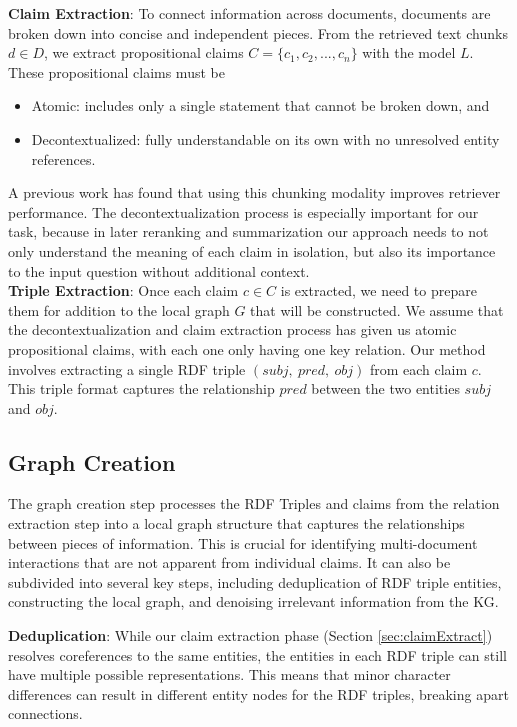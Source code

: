 \documentclass[11pt]{article}
\theoremstyle{definition}
\begin{document}
\noindent
\textbf{Claim Extraction}\label{sec:claimExtract}: To connect information across documents, documents are broken down into concise and independent pieces. From the retrieved text chunks $d \in D$, we extract propositional claims $C = \{c_1, c_2, ..., c_n\}$ with the model $L$. These propositional claims must be
\begin{itemize}[noitemsep,leftmargin=*]
    \item Atomic: includes only a single statement that cannot be broken down, and
    \item Decontextualized: fully understandable on its own with no unresolved entity references.
\end{itemize}
A previous work \cite{DBLP:conf/emnlp/Chen0C0MZ0024} has found that using this chunking modality improves retriever performance. The decontextualization process is especially important for our task, because in later reranking and summarization our approach needs to not only understand the meaning of each claim in isolation, but also its importance to the input question without additional context.\\

\noindent
\textbf{Triple Extraction}\label{sec:tripleExtract}: Once each claim $c \in C$ is extracted, we need to prepare them for addition to the local graph $G$ that will be constructed. We assume that the decontextualization and claim extraction process has given us atomic propositional claims, with each one only having one key relation. Our method involves extracting a single RDF triple $(subj,\ pred,\ obj)$ from each claim $c$. This triple format captures the relationship $pred$ between the two entities $subj$ and $obj$.  

\subsection{Graph Creation}\label{sec:graphcreate}
The graph creation step processes the RDF Triples and claims from the relation extraction step into a local graph structure that captures the relationships between pieces of information. This is crucial for identifying multi-document interactions that are not apparent from individual claims. It can also be subdivided into several key steps, including deduplication of RDF triple entities, constructing the local graph, and denoising irrelevant information from the KG.
\newline

\noindent
\textbf{Deduplication}\label{sec:dedup}: While our claim extraction phase (Section \ref{sec:claimExtract}) resolves coreferences to the same entities, the entities in each RDF triple can still have multiple possible representations. This means that minor character differences can result in different entity nodes for the RDF triples, breaking apart connections.
\end{document}
